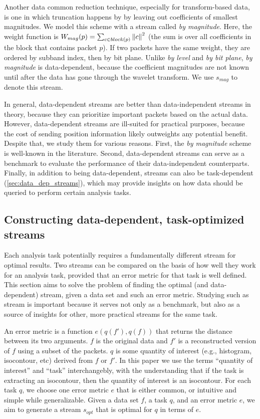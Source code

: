 Another data common reduction technique, especially for transform-based data, is one in which
truncation happens by by leaving out coefficients of smallest magnitudes. We model this scheme with
a stream called \emph{by magnitude}. Here, the weight function is $W_{mag}(p)=\sum_{c\in
block(p)}\left\lVert c\right\rVert^2$ (the sum is over all coefficients in the block that contains packet $p$). If
two packets have the same weight, they are ordered by subband index, then by bit plane. Unlike
\emph{by level} and \emph{by bit plane}, \emph{by magnitude} is data-dependent, because the
coefficient magnitudes are not known until after the data has gone through the wavelet transform. We
use $s_{mag}$ to denote this stream.

In general, data-dependent streams are better than data-independent streams in theory, because they
can prioritize important packets based on the actual data. However, data-dependent streams are
ill-suited for practical purposes, because the cost of sending position information likely
outweights any potential benefit. Despite that, we study them for various reasons. First, the
\emph{by magnitude} scheme is well-known in the literature. Second, data-dependent streams can serve
as a benchmark to evaluate the performance of their data-independent counterparts. Finally, in
addition to being data-dependent, streams can also be task-dependent
(\autoref{sec:data_dep_streams}), which may provide insights on how data should be queried to
perform certain analysis tasks.

\subsection{Constructing data-dependent, task-optimized streams}\label{sec:data_dep_streams}
Each analysis task potentially requires a fundamentally different stream for optimal results. Two
streams can be compared on the basis of how well they work for an analysis task, provided that an
error metric for that task is well defined. This section aims to solve the problem of finding the
optimal (and data-dependent) stream, given a data set and such an error metric. Studying such as
stream is important because it serves not only as a benchmark, but also as a source of insights for
other, more practical streams for the same task.

An error metric is a function $e(q(f'),q(f))$ that returns the distance between its two arguments.
$f$ is the original data and $f'$ is a reconstructed version of $f$ using a subset of the packets.
$q$ is some quantity of interest (e.g., histogram, isocontour, etc) derived from $f$ or $f'$. In
this paper we use the terms ``quantity of interest'' and ``task'' interchangebly, with the
understanding that if the task is extracting an isocontour, then the quantity of interest is an
isocontour. For each task $q$, we choose one error metric $e$ that is either common, or intuitive
and simple while generalizable. Given a data set $f$, a task $q$, and an error metric $e$, we aim to
generate a stream $s_{opt}$ that is optimal for $q$ in terms of $e$.

